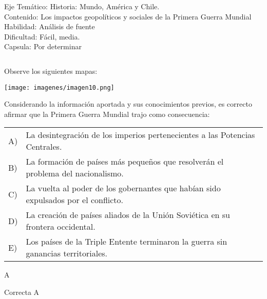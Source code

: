 \documentclass[letterpaper,11pt]{article}
\newcommand{\anchopregunta}{0.9\textwidth}
\begin{document}
\begin{enumerate}
\begin{minipage}{\anchopregunta}
\begin{info} %
\begin{flushleft}
Eje Temático: Historia: Mundo, América y Chile.\\
Contenido: Los impactos geopolíticos y sociales de la Primera Guerra Mundial\\
Habilidad: Análisis de fuente\\
Dificultad: Fácil, media.\\
Capsula: Por determinar \\
\end{flushleft} 
\end{info}
\end{minipage}\vfill$\;$ %

\begin{minipage}{\anchopregunta}
\item Observe los siguientes mapas:
\begin{center}
    \texttt{[image: imagenes/imagen10.png]}
\end{center}
Considerando la información aportada y sus conocimientos previos, es correcto afirmar que la Primera Guerra Mundial trajo como consecuencia:
\begin{flushleft}\begin{tabular}{@{\hspace{-.001\textwidth}}l@{\hspace{2pt}}p{}}
A)& La desintegración de los imperios pertenecientes a las Potencias Centrales.\\
B)& La formación de países más pequeños que resolverán el problema del nacionalismo.\\
C)& La vuelta al poder de los gobernantes que habían sido expulsados por el conflicto.\\
D)& La creación de países aliados de la Unión Soviética en su frontera occidental.\\
E)& Los países de la Triple Entente terminaron la guerra sin ganancias territoriales.\\ 
\end{tabular}\end{flushleft}%
\begin{key} A
\end{key} 
\begin{hint}
\end{hint}
\begin{answer} Correcta A \\
\end{answer}

\end{minipage}
\end{enumerate}
\end{document}
